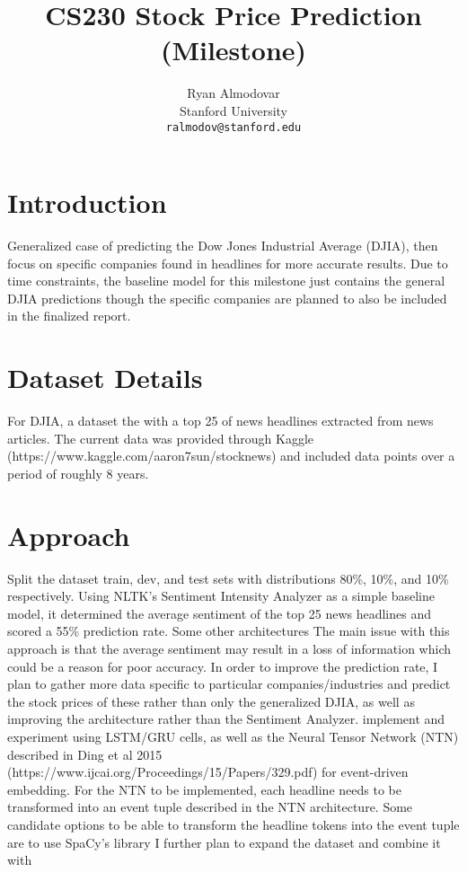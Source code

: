 \documentclass{article} %
\title{CS230 Stock Price Prediction (Milestone)}
\author{
Ryan Almodovar \\
Stanford University\\
\texttt{ralmodov@stanford.edu} \\
}
\begin{document}
\maketitle


\section{Introduction}
Generalized case of predicting the Dow Jones Industrial Average (DJIA), then focus on specific companies found in headlines
for more accurate results.
Due to time constraints, the baseline model for this milestone just contains the general DJIA predictions though the
specific companies are planned to also be included in the finalized report.

\section{Dataset Details}
For DJIA, a dataset the with a top 25 of news headlines extracted from news articles.
The current data was provided through Kaggle (https://www.kaggle.com/aaron7sun/stocknews) and included data points over a period of roughly 8 years.

\section{Approach}
Split the dataset train, dev, and test sets with distributions 80\%, 10\%, and 10\% respectively.
Using NLTK's Sentiment Intensity Analyzer as a simple baseline model, it determined the average sentiment of the top 25 news headlines and scored a 55\% prediction rate. 
Some other architectures 
The main issue with this approach is that the average sentiment may result in a loss of information which could be a reason for poor accuracy.
In order to improve the prediction rate, I plan to gather more data specific to particular companies/industries and predict the stock prices of these rather than only the generalized DJIA, as well as improving the architecture rather than the Sentiment Analyzer.
implement and experiment using LSTM/GRU cells, as well as the Neural Tensor Network (NTN) described in Ding et al 2015 (https://www.ijcai.org/Proceedings/15/Papers/329.pdf) for event-driven embedding.
For the NTN to be implemented, each headline needs to be transformed into an event tuple described in the NTN architecture.
Some candidate options to be able to transform the headline tokens into the event tuple are to use SpaCy's library
I further plan to expand the dataset and combine it with 
\end{document}
